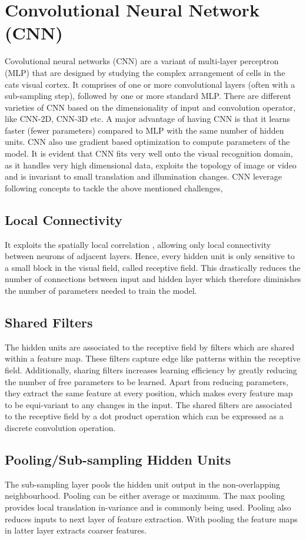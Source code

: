 \section{Convolutional Neural Network (CNN)}
 \label{sec:cnn}
 \par Covolutional neural networks (CNN) are a variant of multi-layer perceptron (MLP) that are designed by studying the complex arrangement of cells in the cats visual cortex. It comprises of one or more convolutional layers (often with a sub-sampling step), followed by one or more standard MLP. There are different varieties of CNN based on the dimensionality of input and convolution operator, like CNN-2D, CNN-3D etc. A major advantage of having CNN is that it learns faster (fewer parameters) compared to  MLP with the same number of hidden units. CNN  also use  gradient based optimization to compute parameters of the model. It is  evident that CNN fits very well onto the visual recognition domain, as it handles very high dimensional data, exploits the topology of image or video and is invariant to small translation and illumination changes.  CNN leverage following concepts to tackle the above mentioned challenges,
\subsection{Local Connectivity}
It exploits the spatially local correlation , allowing only local connectivity between neurons of adjacent layers. Hence, every hidden unit is only sensitive to a small block in the visual field, called receptive field. This drastically reduces the number of connections between input and hidden layer which therefore diminishes the number of parameters needed to train the model.
\subsection{Shared Filters}
The hidden units are associated to the receptive field by filters which are shared within a feature map. These filters capture edge like patterns within the receptive field. Additionally, sharing filters increases learning efficiency by greatly reducing the number of free parameters to be learned. Apart from reducing parameters, they extract the same feature at every position, which makes every feature map to be equi-variant to any changes in the input. The shared filters are associated to the receptive field by a dot product operation which can be expressed as a discrete convolution operation.
\subsection{Pooling/Sub-sampling Hidden Units}
The sub-sampling layer pools the hidden unit output in the non-overlapping neighbourhood. Pooling can be either average or maximum.  The max pooling provides local translation in-variance and is commonly being used. Pooling also reduces inputs to next layer of feature extraction. With pooling the feature maps in latter layer extracts coarser features.

